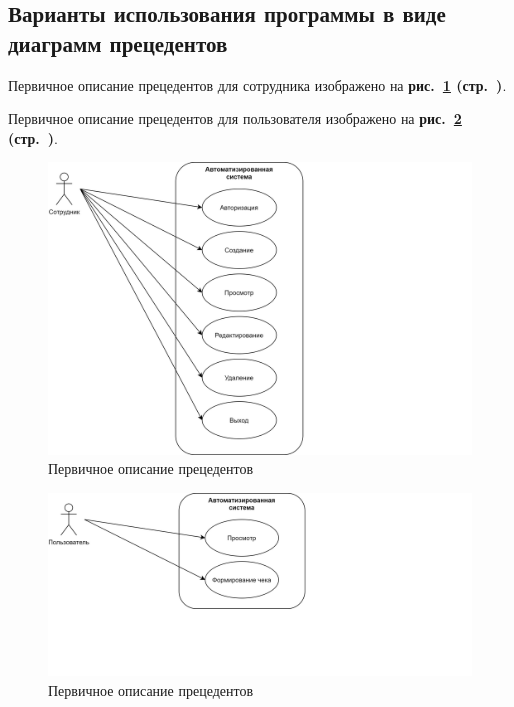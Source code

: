 \newpage

\subsection{Варианты использования программы в виде диаграмм прецедентов}

Первичное описание прецедентов для сотрудника изображено
на \textbf{рис.~\ref{fig:gpi_description_of_updated_use_case_employee} (стр.~\pageref{fig:gpi_description_of_updated_use_case_employee})}.

Первичное описание прецедентов для пользователя изображено
на \textbf{рис.~\ref{fig:gpi_description_of_updated_use_case_user} (стр.~\pageref{fig:gpi_description_of_updated_use_case_user})}.

\begin{figure}[!p]
    \centering
    \includegraphics[width=14cm]
        {_assets/gpi_description_of_use_case_employee.png}
    \caption{Первичное описание прецедентов}
    \label{fig:gpi_description_of_updated_use_case_employee}
\end{figure}

\begin{figure}[!p]
    \centering
    \includegraphics[width=14cm]
        {_assets/gpi_description_of_use_case_user.png}
    \caption{Первичное описание прецедентов}
    \label{fig:gpi_description_of_updated_use_case_user}
\end{figure}

